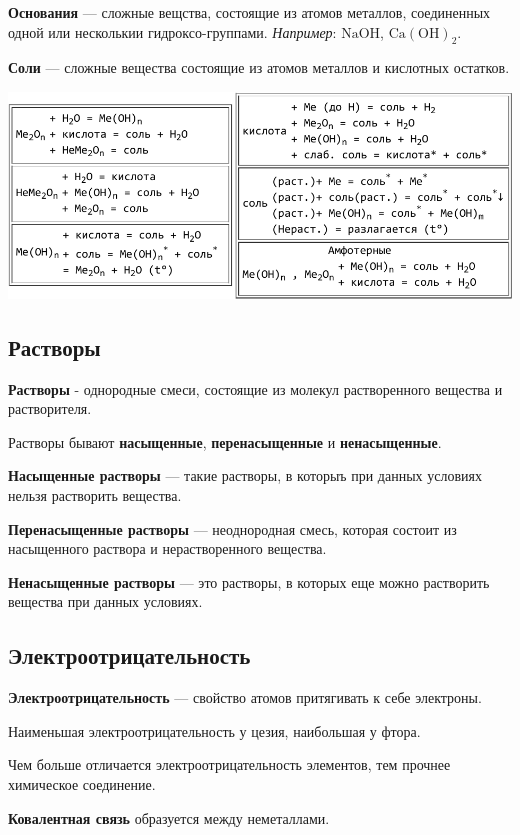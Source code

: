 \documentclass[12pt,a4paper]{article}
\begin{document}
{\bfseries Основания} --- сложные вещства, состоящие из атомов металлов, соединенных одной или несколькии гидроксо-группами. {\itshape Например}: $\mathrm{ NaOH }$, $\mathrm{ Ca(OH)_2 }$.

{\bfseries Соли} --- сложные вещества состоящие из атомов металлов и кислотных остатков.

\noindent\includegraphics[width=1\textwidth]{ximiya-crop}

\subsection{Растворы}

{\bfseries Растворы} - однородные смеси, состоящие из молекул растворенного вещества и растворителя.

Растворы бывают {\bfseries насыщенные}, {\bfseries перенасыщенные} и {\bfseries ненасыщенные}.

{\bfseries Насыщенные растворы} --- такие растворы, в которыъ при данных условиях нельзя растворить вещества.

{\bfseries Перенасыщенные растворы} --- неоднородная смесь, которая состоит из насыщенного раствора и нерастворенного вещества.

{\bfseries Ненасыщенные растворы} --- это растворы, в которых еще можно растворить вещества при данных условиях.

\subsection{Электроотрицательность}

{\bfseries Электроотрицательность} --- свойство атомов притягивать к себе электроны.

Наименьшая электроотрицательность у цезия, наибольшая у фтора.

Чем больше отличается электроотрицательность элементов, тем прочнее химическое соединение.

{\bfseries Ковалентная связь} образуется между неметаллами.
\end{document}
